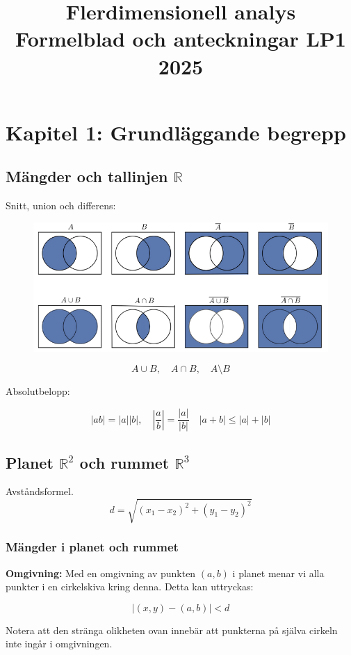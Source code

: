 \documentclass[a4paper,12pt]{article}
\title{Flerdimensionell analys \\ Formelblad och anteckningar LP1 2025}
\date{}
\begin{document}
\maketitle

\section{Kapitel 1: Grundläggande begrepp}

\subsection{Mängder och tallinjen $\mathbb{R}$}
Snitt, union och differens:
\begin{figure}[H]
  \centering
  \includegraphics[width=1\textwidth]{snittuniondifferens.png}
\end{figure}

\[
A \cup B, \quad A \cap B, \quad A \setminus B
\]

Absolutbelopp:

\[
    |ab| = |a||b|, \quad |\frac{a}{b}| = \frac{|a|}{|b|} \quad |a+b| \leq |a| + |b|
\]

\subsection{Planet $\mathbb{R}^2$ och rummet $\mathbb{R}^3$}
Avståndsformel.  
\[
    d = \sqrt{(x_1 - x_2)^2 + (y_1 - y_2)^2}
\]

\subsubsection*{Mängder i planet och rummet}
\textbf{Omgivning:}  
Med en omgivning av punkten $(a, b)$ i planet menar vi alla punkter i en cirkelskiva kring denna. Detta kan uttryckas:

\[
|(x,y) - (a,b)| < d
\]

Notera att den stränga olikheten ovan innebär att punkterna på själva cirkeln inte ingår i omgivningen.
\end{document}
